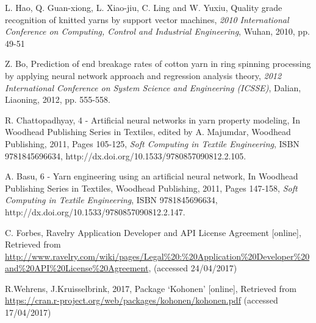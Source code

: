 \documentclass[journal]{IEEEtran}
\begin{document}
%
%
%
\begin{thebibliography}{30}

L. Hao, Q. Guan-xiong, L. Xiao-jiu, C. Ling and W. Yuxiu, Quality grade recognition of knitted yarns by support vector machines, \emph{2010 International Conference on Computing, Control and Industrial Engineering},
 Wuhan,
 2010,
 pp. 49-51

Z. Bo, Prediction of end breakage rates of cotton yarn in ring spinning processing by applying neural network approach and regression analysis theory, 
\emph{2012 International Conference on System Science and Engineering (ICSSE)},
 Dalian,
 Liaoning,
 2012, pp. 555-558.

R. Chattopadhyay, 4 - Artificial neural networks in yarn property modeling, In Woodhead Publishing Series in Textiles, edited by A. Majumdar, Woodhead Publishing, 2011, Pages 105-125, \emph{Soft Computing in Textile Engineering}, ISBN 9781845696634, http://dx.doi.org/10.1533/9780857090812.2.105.

A. Basu, 6 - Yarn engineering using an artificial neural network,
 In Woodhead Publishing Series in Textiles, Woodhead Publishing,
 2011, Pages 147-158,\emph{ Soft Computing in Textile Engineering},
 ISBN 9781845696634, http://dx.doi.org/10.1533/9780857090812.2.147.

C. Forbes,
 Ravelry Application Developer and API License Agreement [online],
 Retrieved from \url{http://www.ravelry.com/wiki/pages/Legal%20:%20Application%20Developer%20and%20API%20License%20Agreement},
 (accessed 24/04/2017)

R.Wehrens, J.Kruisselbrink,
 2017,
 Package ‘Kohonen’ [online], Retrieved from \url{https://cran.r-project.org/web/packages/kohonen/kohonen.pdf} (accessed 17/04/2017)


\end{thebibliography}
\end{document}
